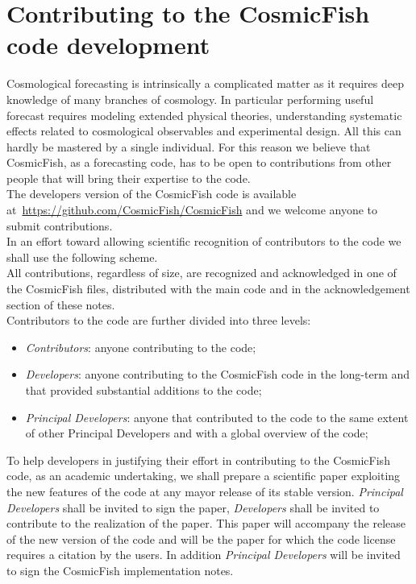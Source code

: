 \documentclass[prd,nofootinbib,showpacs]{revtex4}
\begin{document}
\section{Contributing to the CosmicFish code development}
%
Cosmological forecasting is intrinsically a complicated matter as it requires deep knowledge of many branches of cosmology. 
In particular performing useful forecast requires modeling extended physical theories, understanding systematic effects related to cosmological observables and experimental design.
All this can hardly be mastered by a single individual. For this reason we believe that CosmicFish, as a forecasting code, has to be open to contributions from other people that will bring their expertise to the code. \\
%
The developers version of the CosmicFish code is available at~\url{https://github.com/CosmicFish/CosmicFish} and we welcome anyone to submit contributions. \\
%
In an effort toward allowing scientific recognition of contributors to the code we shall use the following scheme. \\
All contributions, regardless of size, are recognized and acknowledged in one of the CosmicFish files, distributed with the main code and in the acknowledgement section of these notes. \\
%
Contributors to the code are further divided into three levels:
%
\begin{itemize}
\item {\it Contributors}: anyone contributing to the code;
\item {\it Developers}: anyone contributing to the CosmicFish code in the long-term and that provided substantial additions to the code;
\item {\it Principal Developers}: anyone that contributed to the code to the same extent of other Principal Developers and with a global overview of the code;
\end{itemize}
%
To help developers in justifying their effort in contributing to the CosmicFish code, as an academic undertaking, we shall prepare a scientific paper exploiting the new features of the code at any mayor release of its stable version. {\it Principal Developers} shall be invited to sign the paper, {\it Developers} shall be invited to contribute to the realization of the paper. This paper will accompany the release of the new version of the code and will be the paper for which the code license requires a citation by the users. In addition {\it Principal Developers} will be invited to sign the CosmicFish implementation notes.
\end{document}
